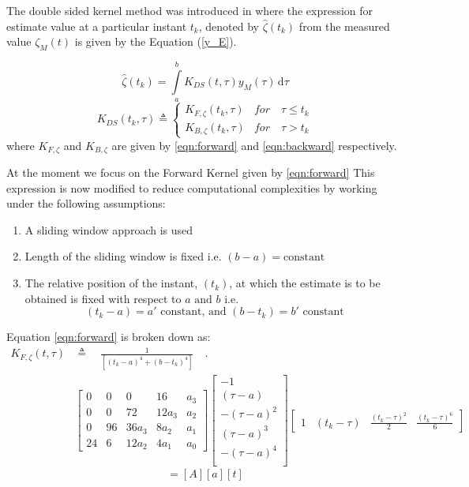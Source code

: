 \documentclass[letterpaper%
, twoside%
, 12pt%
,memoire%
, english%
,creativecommons,hyperref%
]{thETS}
\begin{document}
The double sided kernel method was introduced in \citep{RN76} where the expression for estimate value at a particular instant $t_k$, denoted by $\hat{\zeta}(t_k)$ from the measured value $\zeta_M(t)$ is given by the Equation (\ref{y_E}). 

\begin{equation}\label{y_E}
\hat{\zeta}(t_k) = \int\limits_{a}^{b}K_{DS}(t,\tau) y_M(\tau)\, \mathrm{d}\tau
\end{equation}
\begin{equation}
K_{DS}(t_k,\tau) \triangleq \left\{
\begin{array}{lr}
K_{F,\zeta}(t_k,\tau) & for \quad \tau \le t_k\\
K_{B,\zeta}(t_k,\tau) & for \quad \tau > t_k
\end{array}
\right.
\label{K}
\end{equation}
where $K_{F,\zeta}$ and $K_{B,\zeta}$ are given by \eqref{eqn:forward} and \eqref{eqn:backward} respectively. 

At the moment we focus on the Forward Kernel given by \eqref{eqn:forward} This expression is now modified to reduce computational complexities by working under the following assumptions:
\begin{enumerate}
\item A sliding window approach is used
\item Length of the sliding window is fixed i.e. $(b-a)=\textrm{constant}$
\item The relative position of the instant, $(t_k)$,  at which the estimate is to be obtained is fixed with respect to $a\textrm{ and }b \textrm{ i.e. }$ $$ (t_k-a)= a' \textrm{ constant, and } (b-t_k)=b'\textrm{ constant}$$  
\end{enumerate}
Equation \eqref{eqn:forward} is broken down as:
\begin{align} \label{eqn:kernVec1}
K_{F,\zeta}(t,\tau) &\triangleq \quad \frac{1}{[(t_k-a)^4+(b-t_k)^4]} \quad .\nonumber\\
&\begin{bmatrix}
0  &  0  &   0   &  16    &   a_3   \\
0  &  0  &   72   & 12a_3  &   a_2  \\
0  &  96 & 36a_3 &  8a_2  &   a_1   \\
24 &  6  & 12a_2 &  4a_1   &   a_0  
\end{bmatrix}
\begin{bmatrix}
     - 1       \\
 (\tau - a)    \\
-(\tau - a)^2  \\
 (\tau - a)^3  \\
-(\tau - a)^4  \\
\end{bmatrix}
\begin{bmatrix}
1  & (t_k-\tau) & \frac{(t_k-\tau)^2}{2} & \frac{(t_k-\tau)^6}{6}
\end{bmatrix}
\end{align}
\begin{equation} \label{eqn:kernVec2}
= [A][a][t] 
\end{equation}
\end{document}
